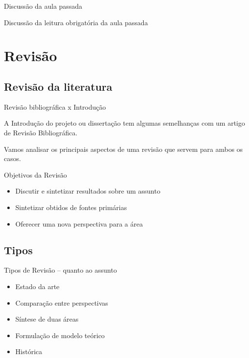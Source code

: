 \documentclass{beamer}
\begin{document}

\begin{frame}{Discussão da aula passada}
  \begin{block}{}
    Discussão da leitura obrigatória da aula passada
  \end{block}
\end{frame}

\section{Revisão}

\subsection{Revisão da literatura}

\begin{frame}{Revisão bibliográfica x Introdução}
  \begin{block}{}
    \footnotesize
    A Introdução do projeto ou dissertação tem algumas semelhanças com
    um artigo de Revisão Bibliográfica.

    \bigskip

    Vamos analisar os principais aspectos de uma revisão que servem
    para ambos os casos.
  \end{block}
\end{frame}

\begin{frame}{Objetivos da Revisão}
  \begin{itemize}
    \footnotesize
  \item Discutir e sintetizar resultados sobre um assunto
    \bigskip
  \item Sintetizar obtidos de fontes primárias
    \bigskip
  \item Oferecer uma nova perspectiva para a área
  \end{itemize}
\end{frame}

\subsection{Tipos}

\begin{frame}{Tipos de Revisão -- quanto ao assunto}
  \begin{itemize}
    \scriptsize
  \item Estado da arte
    \bigskip
  \item Comparação entre perspectivas
    \bigskip
  \item Síntese de duas áreas
    \bigskip
  \item Formulação de modelo teórico
    \bigskip
  \item Histórica
  \end{itemize}
\end{frame}
\end{document}
